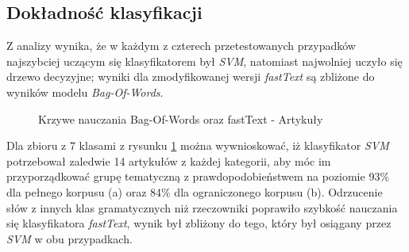 \subsection{Dokładność klasyfikacji}
Z analizy wynika, że w każdym z czterech przetestowanych przypadków najszybciej uczącym się klasyfikatorem był \textit{SVM}, natomiast najwolniej uczyło się drzewo decyzyjne; wyniki dla zmodyfikowanej wersji \textit{fastText} są zbliżone do wyników modelu \textit{Bag-Of-Words}. \cite{comparing-svm-and-nb} \cite{walkowiak2018}
\begin{figure}[ht!]
	\centering
    \qquad
	\caption{Krzywe nauczania Bag-Of-Words oraz fastText - Artykuły}
    \label{fig:learning-curve-articles}
\end{figure}
Dla zbioru z 7 klasami z rysunku \ref{fig:learning-curve-articles} można wywnioskować, iż klasyfikator \textit{SVM} potrzebował zaledwie 14 artykułów z każdej kategorii, aby móc im przyporządkować grupę tematyczną z prawdopodobieństwem na poziomie 93\% dla pełnego korpusu (a) oraz 84\% dla ograniczonego korpusu (b). Odrzucenie słów z innych klas gramatycznych niż rzeczowniki poprawiło szybkość nauczania się klasyfikatora \textit{fastText}, wynik był zbliżony do tego, który był osiągany przez \textit{SVM} w obu przypadkach.  
